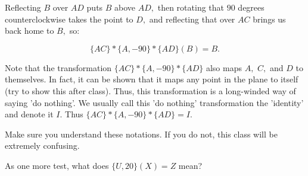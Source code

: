 


Reflecting $B$ over $AD$ puts $B$ above $AD,$ then rotating that $90$ degrees counterclockwise takes the point to $D,$ and reflecting that over $AC$ brings us back home to $B,$ so:

$$\{AC\} * \{A,-90\} * \{AD\} (B) = B.$$

Note that the transformation $\{AC\} * \{A,-90\} * \{AD\}$ also maps $A,$ $C,$ and $D$ to themselves. In fact, it can be shown that it maps any point in the plane to itself (try to show this after class). Thus, this transformation is a long-winded way of saying 'do nothing'.  We usually call this 'do nothing' transformation the 'identity' and denote it $I.$  Thus $\{AC\} * \{A,-90\} * \{AD\} = I$.

Make sure you understand these notations.  If you do not, this class will be extremely confusing.

As one more test, what does $\{U, 20\} (X) = Z$ mean?








